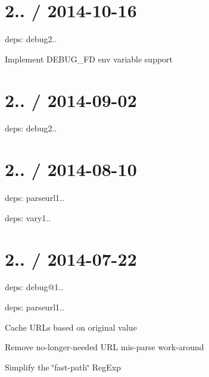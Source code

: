 \section*{2.. / 2014-\/10-\/16 }


\begin{DoxyItemize}
\item deps\+: debug2..
\begin{DoxyItemize}
\item Implement {\ttfamily D\+E\+B\+U\+G\+\_\+\+FD} env variable support
\end{DoxyItemize}
\end{DoxyItemize}

\section*{2.. / 2014-\/09-\/02 }


\begin{DoxyItemize}
\item deps\+: debug2..
\end{DoxyItemize}

\section*{2.. / 2014-\/08-\/10 }


\begin{DoxyItemize}
\item deps\+: parseurl1..
\item deps\+: vary1..
\end{DoxyItemize}

\section*{2.. / 2014-\/07-\/22 }


\begin{DoxyItemize}
\item deps\+: debug@1..
\item deps\+: parseurl1..
\begin{DoxyItemize}
\item Cache U\+R\+Ls based on original value
\item Remove no-\/longer-\/needed U\+RL mis-\/parse work-\/around
\item Simplify the \char`\"{}fast-\/path\char`\"{} {\ttfamily Reg\+Exp}
\end{DoxyItemize}
\end{DoxyItemize}

